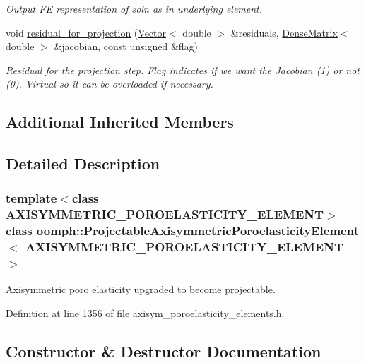 \begin{DoxyCompactItemize}
\begin{DoxyCompactList}\small\item\em Output FE representation of soln as in underlying element. \end{DoxyCompactList}\item 
void \hyperlink{classoomph_1_1ProjectableAxisymmetricPoroelasticityElement_a0ae5521eeba28eeef8eb28741597ea44}{residual\+\_\+for\+\_\+projection} (\hyperlink{classoomph_1_1Vector}{Vector}$<$ double $>$ \&residuals, \hyperlink{classoomph_1_1DenseMatrix}{Dense\+Matrix}$<$ double $>$ \&jacobian, const unsigned \&flag)
\begin{DoxyCompactList}\small\item\em Residual for the projection step. Flag indicates if we want the Jacobian (1) or not (0). Virtual so it can be overloaded if necessary. \end{DoxyCompactList}\end{DoxyCompactItemize}
\subsection*{Additional Inherited Members}


\subsection{Detailed Description}
\subsubsection*{template$<$class A\+X\+I\+S\+Y\+M\+M\+E\+T\+R\+I\+C\+\_\+\+P\+O\+R\+O\+E\+L\+A\+S\+T\+I\+C\+I\+T\+Y\+\_\+\+E\+L\+E\+M\+E\+NT$>$\newline
class oomph\+::\+Projectable\+Axisymmetric\+Poroelasticity\+Element$<$ A\+X\+I\+S\+Y\+M\+M\+E\+T\+R\+I\+C\+\_\+\+P\+O\+R\+O\+E\+L\+A\+S\+T\+I\+C\+I\+T\+Y\+\_\+\+E\+L\+E\+M\+E\+N\+T $>$}

Axisymmetric poro elasticity upgraded to become projectable. 

Definition at line 1356 of file axisym\+\_\+poroelasticity\+\_\+elements.\+h.



\subsection{Constructor \& Destructor Documentation}
\mbox{\label{classoomph_1_1ProjectableAxisymmetricPoroelasticityElement_a346b0bf035991f172569177b1079d8c6}} 
